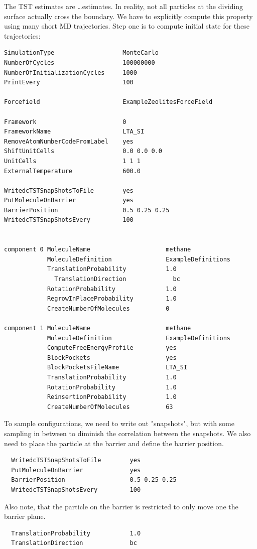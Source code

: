 The TST estimates are \dots estimates. In reality, not all particles at the dividing surface actually cross
the boundary. We have to explicitly compute this property using many short MD trajectories.
Step one is to compute initial state for these trajectories:
\begin{tiny}
\begin{verbatim}
SimulationType                   MonteCarlo
NumberOfCycles                   100000000
NumberOfInitializationCycles     1000
PrintEvery                       100

Forcefield                       ExampleZeolitesForceField

Framework                        0
FrameworkName                    LTA_SI
RemoveAtomNumberCodeFromLabel    yes
ShiftUnitCells                   0.0 0.0 0.0
UnitCells                        1 1 1
ExternalTemperature              600.0

WritedcTSTSnapShotsToFile        yes
PutMoleculeOnBarrier             yes
BarrierPosition                  0.5 0.25 0.25
WritedcTSTSnapShotsEvery         100


component 0 MoleculeName                     methane
            MoleculeDefinition               ExampleDefinitions
            TranslationProbability           1.0
              TranslationDirection             bc
            RotationProbability              1.0
            RegrowInPlaceProbability         1.0
            CreateNumberOfMolecules          0

component 1 MoleculeName                     methane
            MoleculeDefinition               ExampleDefinitions
            ComputeFreeEnergyProfile         yes
            BlockPockets                     yes
            BlockPocketsFileName             LTA_SI
            TranslationProbability           1.0
            RotationProbability              1.0
            ReinsertionProbability           1.0
            CreateNumberOfMolecules          63
\end{verbatim}
\end{tiny}

To sample configurations, we need to write out "snapshots", but with some sampling in between to diminish the
correlation between the snapshots. We also need to place the particle at the barrier and define the barrier position.

\begin{small}
\begin{verbatim}
  WritedcTSTSnapShotsToFile        yes
  PutMoleculeOnBarrier             yes
  BarrierPosition                  0.5 0.25 0.25
  WritedcTSTSnapShotsEvery         100
\end{verbatim}
\end{small}
Also note, that the particle on the barrier is restricted to only move one the barrier plane.
\begin{small}
\begin{verbatim}
  TranslationProbability           1.0
  TranslationDirection             bc
\end{verbatim}
\end{small}


